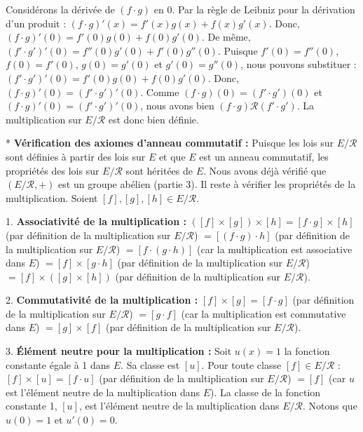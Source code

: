 \documentclass{report}
\begin{document}
    Considérons la dérivée de $(f \cdot g)$ en $0$. Par la règle de Leibniz pour la dérivation d'un produit : $(f \cdot g)'(x) = f'(x)g(x) + f(x)g'(x)$.
    Donc, $(f \cdot g)'(0) = f'(0)g(0) + f(0)g'(0)$.
    De même, $(f' \cdot g')'(0) = f''(0)g'(0) + f'(0)g''(0)$.
    Puisque $f'(0) = f''(0)$, $f(0) = f'(0)$, $g(0) = g'(0)$ et $g'(0) = g''(0)$, nous pouvons substituer :
    $(f' \cdot g')'(0) = f'(0)g(0) + f(0)g'(0)$.
    Donc, $(f \cdot g)'(0) = (f' \cdot g')'(0)$.
    Comme $(f \cdot g)(0) = (f' \cdot g')(0)$ et $(f \cdot g)'(0) = (f' \cdot g')'(0)$, nous avons bien $(f \cdot g) \mathcal{R} (f' \cdot g')$.
    La multiplication sur $E/\mathcal{R}$ est donc bien définie.

*   \textbf{Vérification des axiomes d'anneau commutatif :}
    Puisque les lois sur $E/\mathcal{R}$ sont définies à partir des lois sur $E$ et que $E$ est un anneau commutatif, les propriétés des lois sur $E/\mathcal{R}$ sont héritées de $E$. Nous avons déjà vérifié que $(E/\mathcal{R}, +)$ est un groupe abélien (partie 3). Il reste à vérifier les propriétés de la multiplication. Soient $[f], [g], [h] \in E/\mathcal{R}$.

    1.  \textbf{Associativité de la multiplication :}
        $([f] \times [g]) \times [h] = [f \cdot g] \times [h]$ (par définition de la multiplication sur $E/\mathcal{R}$)
        $= [(f \cdot g) \cdot h]$ (par définition de la multiplication sur $E/\mathcal{R}$)
        $= [f \cdot (g \cdot h)]$ (car la multiplication est associative dans $E$)
        $= [f] \times [g \cdot h]$ (par définition de la multiplication sur $E/\mathcal{R}$)
        $= [f] \times ([g] \times [h])$ (par définition de la multiplication sur $E/\mathcal{R}$).

    2.  \textbf{Commutativité de la multiplication :}
        $[f] \times [g] = [f \cdot g]$ (par définition de la multiplication sur $E/\mathcal{R}$)
        $= [g \cdot f]$ (car la multiplication est commutative dans $E$)
        $= [g] \times [f]$ (par définition de la multiplication sur $E/\mathcal{R}$).

    3.  \textbf{Élément neutre pour la multiplication :}
        Soit $u(x) = 1$ la fonction constante égale à 1 dans $E$. Sa classe est $[u]$.
        Pour toute classe $[f] \in E/\mathcal{R}$ :
        $[f] \times [u] = [f \cdot u]$ (par définition de la multiplication sur $E/\mathcal{R}$)
        $= [f]$ (car $u$ est l'élément neutre de la multiplication dans $E$).
        La classe de la fonction constante 1, $[u]$, est l'élément neutre de la multiplication dans $E/\mathcal{R}$. Notons que $u(0)=1$ et $u'(0)=0$.
\end{document}
